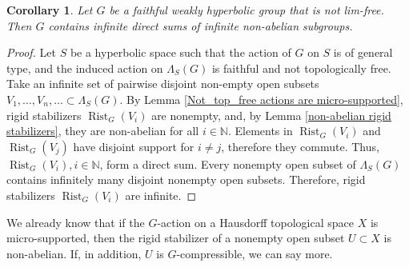 \documentclass[11pt,letterpaper]{article}
\newcommand{\NN}{\mathbb{N}}
\DeclareMathOperator{\rist}{Rist}
\DeclareMathOperator{\cd}{cd}
\DeclareMathOperator{\vcd}{vcd}
\newtheorem{cor}[thm]{Corollary}
\theoremstyle{definition}
\theoremstyle{remark}
\begin{document}
\begin{cor}\label{infinite direct products}
Let $G$ be a faithful weakly hyperbolic group that is not lim-free. Then $G$ contains infinite direct sums of infinite non-abelian subgroups. %
\end{cor}
\begin{proof}
Let $S$ be a hyperbolic space such that the action of $G$ on $S$ is of general type, and the induced action on $\Lambda_S(G)$ is faithful and not topologically free. Take an infinite set of pairwise disjoint non-empty open subsets $V_1, \dots, V_n, \dots \subset \Lambda_S(G)$. By Lemma \ref{Not_top_free actions are micro-supported}, rigid stabilizers $\rist_G(V_i)$ are nonempty, and, by Lemma \ref{non-abelian rigid stabilizers}, they are non-abelian for all $i \in \NN$. Elements in $\rist_G(V_i)$ and $\rist_G(V_j)$ have disjoint support for $i \neq j$, therefore they commute. Thus, $\rist_G(V_i), i \in \NN$, form a direct sum. Every nonempty open subset of $\Lambda_S(G)$ contains infinitely many disjoint nonempty open subsets. Therefore, rigid stabilizers $\rist_G(V_i)$ are infinite.
\end{proof}

We already know that if the $G$-action on a Hausdorff topological space $X$ is micro-supported, then the rigid stabilizer of a nonempty open subset $U \subset X$ is non-abelian. If, in addition, $U$ is $G$-compressible, we can say more.  
\end{document}

